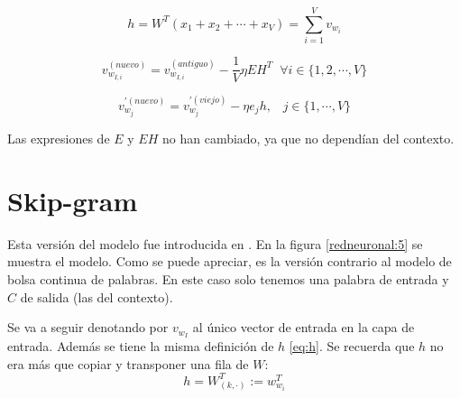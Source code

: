\begin{equation}
  h = W^T(x_1+x_2+\cdots + x_V) = \sum_{i=1}^V v_{w_i}
\end{equation}

\begin{equation}
  v_{w_{I,i}}^{(nuevo)} = v_{w_{I,i}}^{(antiguo)} - \frac{1}{V}\eta EH^T \;\; \forall i \in \{1,2,\cdots, V \}
\end{equation}

\begin{equation}
  v_{w_j}^{'(nuevo)}=v_{w_j}^{'(viejo)} - \eta e_j h, \;\;\; j \in \{1, \cdots, V\}
\end{equation}

Las expresiones de $E$ y $EH$ no han cambiado, ya que no dependían del contexto.

\section{Skip-gram}

Esta versión del modelo fue introducida en \cite{word2vec:1} \cite{word2vec:2}. En la figura \ref{redneuronal:5} se muestra el modelo. Como se
puede apreciar, es la versión contrario al modelo de bolsa continua de palabras. En este caso solo tenemos una palabra de entrada y $C$ de salida (las
del contexto).

Se va a seguir denotando por $v_{w_I}$ al único vector de entrada en la capa de entrada. Además se tiene la misma definición de $h$ \ref{eq:h}. Se recuerda que $h$
no era más que copiar y transponer una fila de $W$:
\[
  h = W_{(k,\cdot)}^T := w_{w_i}^T
\]

